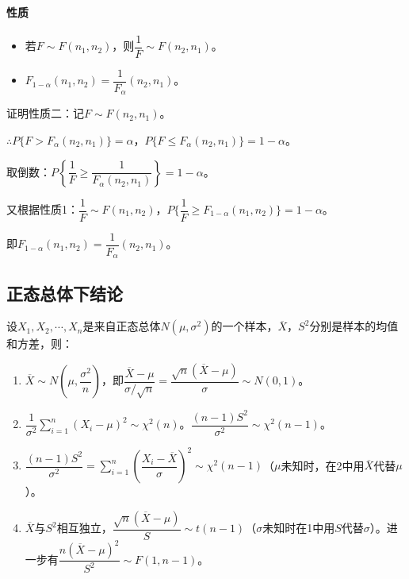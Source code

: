 \documentclass[UTF8, 12pt]{ctexart}
\begin{document}

\paragraph{性质} \leavevmode \medskip

\begin{itemize}
    \item 若$F\sim F(n_1,n_2)$，则$\dfrac{1}{F}\sim F(n_2,n_1)$。
    \item $F_{1-\alpha}(n_1,n_2)=\dfrac{1}{F_\alpha}(n_2,n_1)$。
\end{itemize}

证明性质二：记$F\sim F(n_2,n_1)$。

$\therefore P\{F>F_\alpha(n_2,n_1)\}=\alpha$，$P\{F\leqslant F_\alpha(n_2,n_1)\}=1-\alpha$。

取倒数：$P\left\{\dfrac{1}{F}\geqslant\dfrac{1}{F_\alpha(n_2,n_1)}\right\}=1-\alpha$。

又根据性质1：$\dfrac{1}{F}\sim F(n_1,n_2)$，$P\{\dfrac{1}{F}\geqslant F_{1-\alpha}(n_1,n_2)\}=1-\alpha$。

即$F_{1-\alpha}(n_1,n_2)=\dfrac{1}{F_\alpha}(n_2,n_1)$。

\subsection{正态总体下结论}

设$X_1,X_2,\cdots,X_n$是来自正态总体$N(\mu,\sigma^2)$的一个样本，$\overline{X}$，$S^2$分别是样本的均值和方差，则：

\begin{enumerate}
    \item $\overline{X}\sim N\left(\mu,\dfrac{\sigma^2}{n}\right)$，即$\dfrac{\overline{X}-\mu}{\sigma/\sqrt{n}}=\dfrac{\sqrt{n}(\overline{X}-\mu)}{\sigma}\sim N(0,1)$。
    \item $\dfrac{1}{\sigma^2}\sum\limits_{i=1}^n(X_i-\mu)^2\sim\chi^2(n)$。$\dfrac{(n-1)S^2}{\sigma^2}\sim\chi^2(n-1)$。
    \item $\dfrac{(n-1)S^2}{\sigma^2}=\sum\limits_{i=1}^n\left(\dfrac{X_i-\overline{X}}{\sigma}\right)^2\sim\chi^2(n-1)$（$\mu$未知时，在2中用$\overline{X}$代替$\mu$）。
    \item $\overline{X}$与$S^2$相互独立，$\dfrac{\sqrt{n}(\overline{X}-\mu)}{S}\sim t(n-1)$（$\sigma$未知时在1中用$S$代替$\sigma$）。进一步有$\dfrac{n(\overline{X}-\mu)^2}{S^2}\sim F(1,n-1)$。
\end{enumerate}
\end{document}
